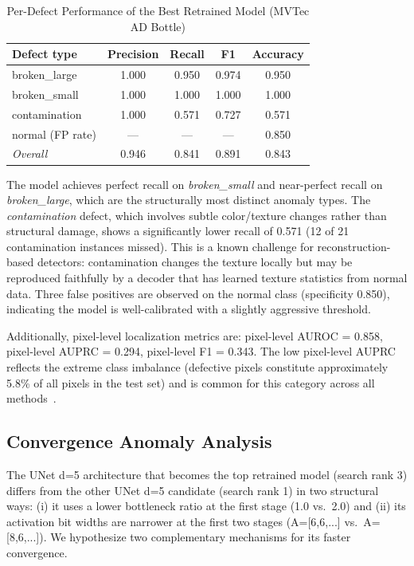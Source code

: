 \documentclass[journal]{IEEEtran}
\begin{document}
\begin{table}[!t]
\caption{Per-Defect Performance of the Best Retrained Model (MVTec AD Bottle)}
\label{tab:per_defect}
\centering
\begin{tabular}{@{}lcccc@{}}
\toprule
\textbf{Defect type} & \textbf{Precision} & \textbf{Recall} &
\textbf{F1} & \textbf{Accuracy} \\
\midrule
broken\_large    & 1.000 & 0.950 & 0.974 & 0.950 \\
broken\_small    & 1.000 & 1.000 & 1.000 & 1.000 \\
contamination    & 1.000 & 0.571 & 0.727 & 0.571 \\
normal (FP rate) & ---   & ---   & ---   & 0.850 \\
\midrule
\textit{Overall} & 0.946 & 0.841 & 0.891 & 0.843 \\
\bottomrule
\end{tabular}
\end{table}

\noindent
The model achieves perfect recall on \textit{broken\_small} and near-perfect
recall on \textit{broken\_large}, which are the structurally most distinct
anomaly types.
The \textit{contamination} defect, which involves subtle color/texture changes
rather than structural damage, shows a significantly lower recall of 0.571
(12 of 21 contamination instances missed).
This is a known challenge for reconstruction-based detectors: contamination
changes the texture locally but may be reproduced faithfully by a decoder
that has learned texture statistics from normal data.
Three false positives are observed on the normal class (specificity 0.850),
indicating the model is well-calibrated with a slightly aggressive threshold.

Additionally, pixel-level localization metrics are: pixel-level
AUROC = 0.858, pixel-level AUPRC = 0.294, pixel-level F1 = 0.343.
The low pixel-level AUPRC reflects the extreme class imbalance (defective
pixels constitute approximately 5.8\% of all pixels in the test set) and is
common for this category across all methods~\cite{bergmann2019mvtec}.

\subsection{Convergence Anomaly Analysis}
\label{sec:convergence_anomaly}

The UNet d=5 architecture that becomes the top retrained model (search rank 3)
differs from the other UNet d=5 candidate (search rank 1) in two structural
ways: (i) it uses a lower bottleneck ratio at the first stage (1.0 vs.\ 2.0)
and (ii) its activation bit widths are narrower at the first two stages
(A=[6,6,...] vs.\ A=[8,6,...]).
We hypothesize two complementary mechanisms for its faster convergence.
\end{document}
